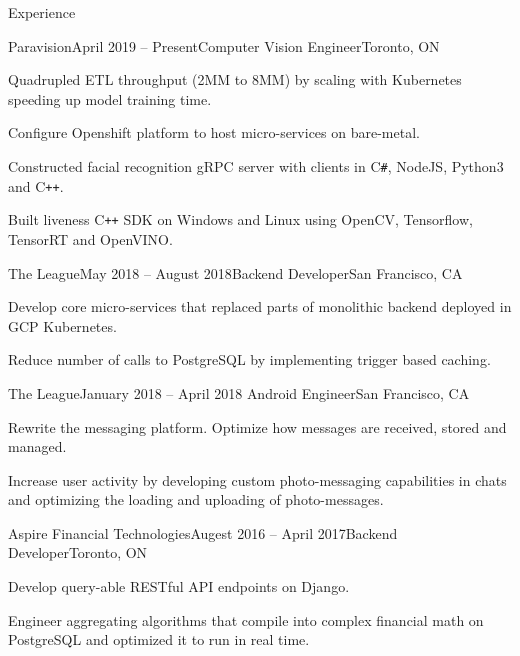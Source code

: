 \documentclass{resume}
\begin{document}
\begin{rSection}{Experience}
\begin{rSubsection}{Paravision}{April 2019 – Present}{Computer Vision Engineer}{Toronto, ON}
    \item Quadrupled ETL throughput (2MM to 8MM) by scaling with Kubernetes speeding up model training time.
    \item Configure Openshift platform to host micro-services on bare-metal.
    \item Constructed facial recognition gRPC server with clients in C\texttt{\#}, NodeJS, Python3 and C\texttt{++}.
    \item Built liveness C\texttt{++} SDK on Windows and Linux using OpenCV, Tensorflow, TensorRT and OpenVINO.
    \end{rSubsection}
    \begin{rSubsection}{The League}{May 2018 – August 2018}{Backend Developer}{San Francisco, CA}
    \item Develop core micro-services that replaced parts of monolithic backend deployed in GCP Kubernetes.
    \item Reduce number of calls to PostgreSQL by implementing trigger based caching.
    \end{rSubsection}
    \begin{rSubsection}{The League}{January 2018 – April 2018 }{Android Engineer}{San Francisco, CA}
    \item Rewrite the messaging platform. Optimize how messages are received, stored and managed.
    \item Increase user activity by developing custom photo-messaging capabilities in chats and optimizing the loading and uploading of photo-messages.
    \end{rSubsection}
    \begin{rSubsection}{Aspire Financial Technologies}{Augest 2016 – April 2017}{Backend Developer}{Toronto, ON}
    \item Develop query-able RESTful API endpoints on Django.
    \item Engineer aggregating algorithms that compile into complex financial math on PostgreSQL and optimized it to run in real time.
    \end{rSubsection}
  \end{rSection}
\end{document}
